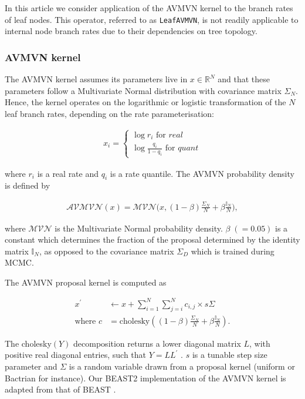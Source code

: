 \documentclass[10pt,letterpaper]{article}
\begin{document}
In this article we consider application of the AVMVN kernel to the branch rates of leaf nodes. 
This operator, referred to as \texttt{LeafAVMVN}, is not readily applicable to internal node branch rates due to their dependencies on tree topology.  




\subsubsection*{AVMVN kernel}


The AVMVN kernel assumes its parameters live in $x \in \mathbb{R}^N$ and that these parameters follow a Multivariate Normal distribution with covariance matrix $\Sigma_N$. Hence, the kernel operates on the logarithmic or logistic transformation of the $N$ leaf branch rates, depending on the rate parameterisation:

\begin{align}
	x_i = \begin{cases} \log r_i \text{ for } \textit{real} \\
						\log \frac{q_i}{1 - q_i} \text{ for } \textit{quant}  \end{cases}
\end{align}

where $r_i$ is a real rate and $q_i$ is a rate quantile. The AVMVN probability density is defined by 


\begin{align}
	\mathcal{AVMVN}(x) =  \mathcal{MVN}\big(x, (1-\beta) \frac{\Sigma_N}{N} + \beta \frac{\mathbb{I}_N}{N} \big) ,
\end{align}


where $\mathcal{MVN}$ is the Multivariate Normal probability density. $\beta \; (= 0.05)$ is a constant which determines the fraction of the proposal determined by the identity matrix $\mathbb{I}_N$, as opposed to the covariance matrix $\Sigma_D$ which is trained during MCMC.

The AVMVN proposal kernel is computed as


\begin{align}
	x^\prime &\leftarrow x + \sum\limits_{i=1}^N \sum\limits_{j=i}^N c_{i,j} \times s\Sigma \\
	\text {where }  c &= \text{cholesky} \left( (1-\beta) \frac{\Sigma_N}{N} + \beta \frac{\mathbb{I}_N}{N} \right).
\end{align}


The cholesky$(Y)$ decomposition returns a lower diagonal matrix $L$, with positive real diagonal entries, such that $Y = LL^\prime$ \cite{lindstrom1988newton, pourahmadi2007cholesky}. $s$ is a tunable step size parameter and $\Sigma$ is a random variable drawn from a proposal kernel (uniform or Bactrian for instance). Our BEAST2 implementation of the AVMVN kernel is adapted from that of BEAST \cite{suchard2018bayesian}.
\end{document}
